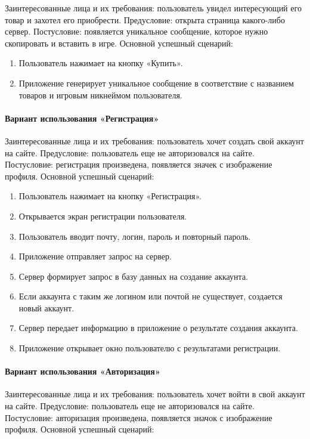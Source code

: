 Заинтересованные лица и их требования: пользователь увидел интересующий его товар и захотел его приобрести. Предусловие: открыта страница какого-либо сервер. Постусловие: появляется уникальное сообщение, которое нужно скопировать и вставить в игре. Основной успешный сценарий:

\begin{enumerate}
	\item Пользователь нажимает на кнопку «Купить».
	\item  Приложение генерирует уникальное сообщение в соответствие с названием товаров и игровым никнеймом пользователя.
\end{enumerate}

\paragraph{Вариант использования «Регистрация»}

Заинтересованные лица и их требования: пользователь хочет создать свой аккаунт на сайте. Предусловие: пользователь еще не авторизовался на сайте. Постусловие: регистрация произведена, появляется значек с изображение профиля. Основной успешный сценарий:

\begin{enumerate}
	\item Пользователь нажимает на кнопку «Регистрация».
	\item Открывается экран регистрации пользователя.
	\item Пользователь вводит почту, логин, пароль и повторный пароль.
	\item Приложение отправляет запрос на сервер.
	\item Сервер формирует запрос в базу данных на создание аккаунта.
	\item Если аккаунта с таким же логином или почтой не существует, создается новый аккаунт.
	\item Сервер передает информацию в приложение о результате создания аккаунта.
	\item Приложение открывает окно пользователю с результатами регистрации.
\end{enumerate}

\paragraph{Вариант использования «Авторизация»}

Заинтересованные лица и их требования: пользователь хочет войти в свой аккаунт на сайте. Предусловие: пользователь еще не авторизовался на сайте. Постусловие: авторизация произведена, появляется значок с изображение профиля. Основной успешный сценарий:

